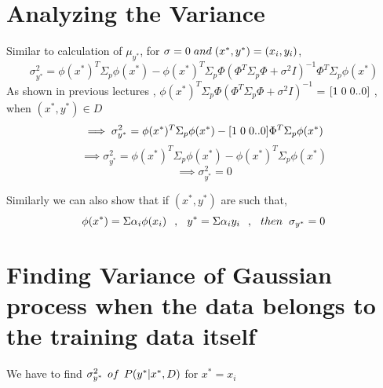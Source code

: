 \documentclass[12pt]{article}
\begin{document}


\section{Analyzing the Variance}

Similar to calculation of $\mu_{y^*} $, for $\sigma =0\hspace{1mm} and\hspace{1mm} (x^*,y^*) = (x_i,y_i) $,
\begin{equation*}
    \sigma_{y^*}^2 = \phi(x^*)^T \Sigma_p \phi(x^*)- \phi(x^*)^T\Sigma_p \Phi(\Phi^T \Sigma_p \Phi + \sigma^2 I)^{-1}\Phi^T \Sigma_p\phi(x^*)
\end{equation*}
    As shown in previous lectures , $\phi(x^*)^T\Sigma_p \Phi(\Phi^T \Sigma_p \Phi + \sigma^2 I)^{-1}$ = $[1\hspace{1mm} 0\hspace{1mm} 0 .. 0]$ , when $(x^*,y^*) \in D$
\begin{equation*}
    \implies \sigma_{y^*}^2 = \phi(x^*)^T \Sigma_p \phi(x^*) - [1\hspace{1mm} 0\hspace{1mm} 0 .. 0] \Phi^T \Sigma_p\phi(x^*)
\end{equation*}
\vspace{-2mm}    
\begin{equation*}
    \implies \sigma_{y^*}^2 = \phi(x^*)^T \Sigma_p \phi(x^*) -  \phi(x^*)^T \Sigma_p \phi(x^*)    
\end{equation*}
\vspace{-2mm}
\begin{equation*}
    \implies \sigma_{y^*}^2 = 0
\end{equation*}

Similarly we can also show that if $(x^*,y^*)$ are such that,
\begin{equation}
    \phi(x^*) = \Sigma \alpha_i \phi(x_i) \hspace{2.5mm},\hspace{2.5mm} y^*=\Sigma \alpha_i y_i \hspace{2.5mm},\hspace{2.5mm} then \hspace{2mm}\sigma_{y^*} = 0
\end{equation}
\section{Finding Variance of Gaussian process when the data belongs to the training data itself}
We have to find \hspace{1mm}  $ \sigma_{y^*}^2 \hspace{1.5mm} of \hspace{1.5mm} P(y^*|x^*,D)$ \hspace{1.5mm} for $x^*=x_i$
\end{document}
